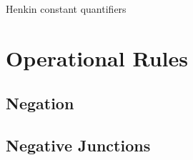 Henkin constant quantifiers

\begin{prooftree}
\end{prooftree}
\quad
\begin{prooftree}
\end{prooftree}

\begin{prooftree}
\end{prooftree}
\quad
\begin{prooftree}
\end{prooftree}

\begin{prooftree}
\end{prooftree}
\quad
\begin{prooftree}
\end{prooftree}

\begin{prooftree}
\end{prooftree}
\quad
\begin{prooftree}
\end{prooftree}

\section{Operational Rules}
\subsection{Negation}

\begin{prooftree}
\end{prooftree}
\quad
\begin{prooftree}
\end{prooftree}


\subsection{Negative Junctions}

